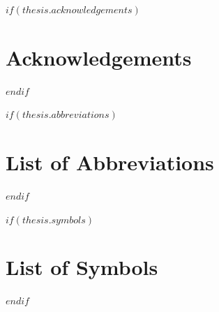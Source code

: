 
$if(thesis.acknowledgements)$
\clearpage
\chapter*{Acknowledgements}

$endif$


\clearpage
\begingroup
\hypersetup{linkcolor=$if(toclinkcolor)$$toclinkcolor$$else$black$endif$}
\tableofcontents
\clearpage
\listoffigures
\clearpage
\listoftables
\endgroup


$if(thesis.abbreviations)$
\clearpage
\chapter*{List of Abbreviations}

$endif$


$if(thesis.symbols)$
\clearpage
\chapter*{List of Symbols}

$endif$


\clearpage
\mainmatter
\pagestyle{thesis}
